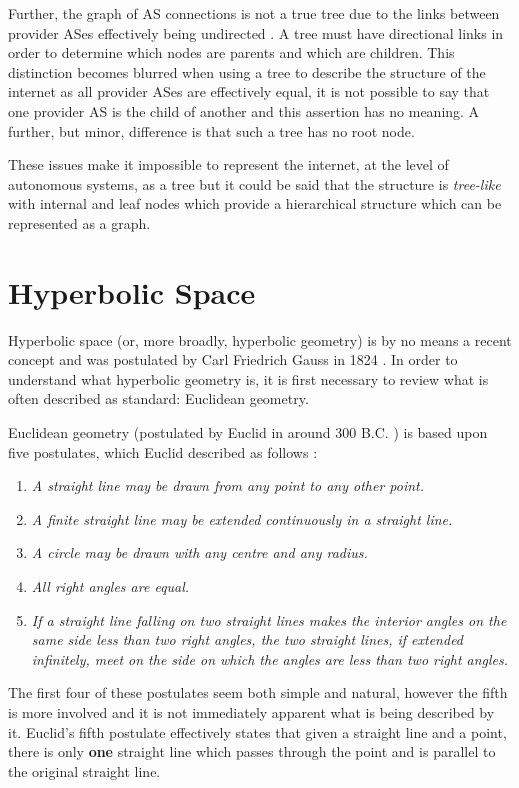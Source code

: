 Further, the graph of AS connections is not a true tree due to the links between provider ASes effectively being undirected \cite{di_battista_computing_2003}. A tree must have directional links in order to determine which nodes are parents and which are children. This distinction becomes blurred when using a tree to describe the structure of the internet as all provider ASes are effectively equal, it is not possible to say that one provider AS is the child of another and this assertion has no meaning. A further, but minor, difference is that such a tree has no root node. 

These issues make it impossible to represent the internet, at the level of autonomous systems, as a tree but it could be said that the structure is \textit{tree-like} with internal and leaf nodes which provide a hierarchical structure which can be represented as a graph.

\section{Hyperbolic Space}
\label{sec:LitReviewHyperbolicSpace}
Hyperbolic space (or, more broadly, hyperbolic geometry) is by no means a recent concept and was postulated by Carl Friedrich Gauss in 1824 \cite{ratcliffe_foundations_2006}. In order to understand what hyperbolic geometry is, it is first necessary to review what is often described as standard: Euclidean geometry.

Euclidean geometry (postulated by Euclid in around 300 B.C. \cite{ratcliffe_foundations_2006}) is based upon five postulates, which Euclid described as follows \cite{ratcliffe_foundations_2006}:
\begin{enumerate}
\item \textit{A straight line may be drawn from any point to any other point.}
\item \textit{A finite straight line may be extended continuously in a straight line.}
\item \textit{A circle may be drawn with any centre and any radius.}
\item \textit{All right angles are equal.}
\item \textit{If a straight line falling on two straight lines makes the interior angles on the same side less than two right angles, the two straight lines, if extended infinitely, meet on the side on which the angles are less than two right angles.}
\end{enumerate}

The first four of these postulates seem both simple and natural, however the fifth is more involved and it is not immediately apparent what is being described by it. Euclid's fifth postulate effectively states that given a straight line and a point, there is only \textbf{one} straight line which passes through the point and is parallel to the original straight line.
 
